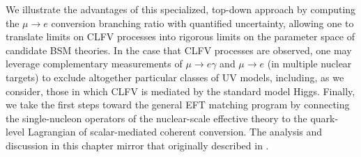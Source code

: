 \documentclass[12pt,letterpaper]{book}
\begin{document}
We illustrate the advantages of this specialized, top-down approach by computing the $\mu\rightarrow e$ conversion branching ratio with quantified uncertainty, allowing one to translate limits on CLFV processes into rigorous limits on the parameter space of candidate BSM theories. In the case that CLFV processes are observed, one may leverage complementary measurements of $\mu\rightarrow e\gamma$ and $\mu\rightarrow e$ (in multiple nuclear targets) to exclude altogether particular classes of UV models, including, as we consider, those in which CLFV is mediated by the standard model Higgs. Finally, we take the first steps toward the general EFT matching program by connecting the single-nucleon operators of the nuclear-scale effective theory to the quark-level Lagrangian of scalar-mediated coherent conversion. The analysis and discussion in this chapter mirror that originally described in \cite{Cirigliano:2022ekw}.
\end{document}
